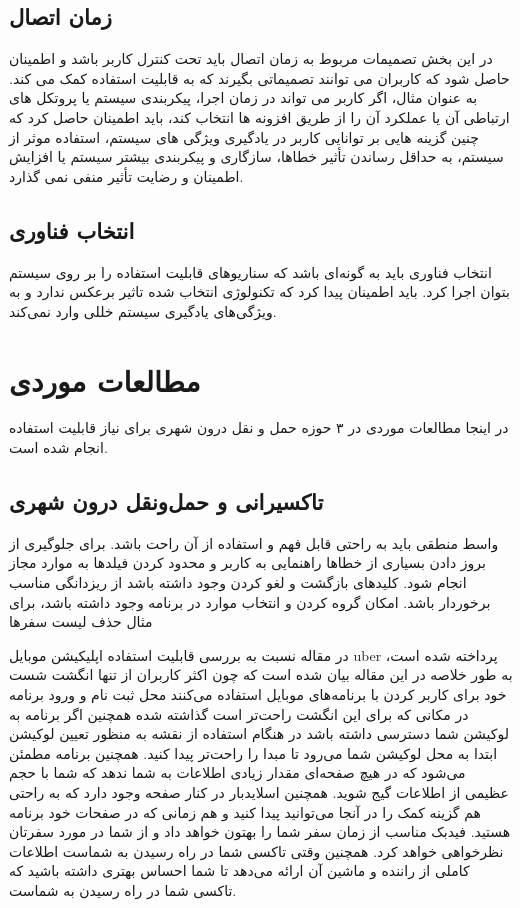 \subsection{زمان اتصال}
در این بخش تصمیمات مربوط به زمان  اتصال باید تحت کنترل کاربر باشد و اطمینان حاصل شود که کاربران می توانند تصمیماتی بگیرند که به قابلیت استفاده کمک می کند.
به عنوان مثال، اگر کاربر می تواند در زمان اجرا، پیکربندی سیستم یا پروتکل های ارتباطی آن یا عملکرد آن را از طریق افزونه ها انتخاب کند، باید اطمینان حاصل کرد که چنین گزینه هایی بر توانایی کاربر در یادگیری ویژگی های سیستم، استفاده موثر از سیستم، به حداقل رساندن تأثیر خطاها، سازگاری و پیکربندی بیشتر سیستم یا افزایش اطمینان و رضایت 
تأثیر منفی نمی گذارد.
\subsection{انتخاب فناوری}
انتخاب فناوری باید به گونه‌ای باشد که سناریو‌های قابلیت استفاده را بر روی سیستم بتوان اجرا کرد.
باید اطمینان پیدا کرد که تکنولوژی انتخاب شده تاثیر برعکس ندارد و به ویژگی‌های یادگیری سیستم خللی وارد نمی‌کند. 


\section{مطالعات موردی}
در اینجا مطالعات موردی در ۳ حوزه حمل و نقل درون شهری برای نیاز قابلیت استفاده انجام شده است. 
\subsection{تاکسیرانی و حمل‌و‌نقل درون شهری}
واسط منطقی باید به راحتی قابل فهم و استفاده از آن راحت باشد. برای جلوگیری از بروز دادن بسیاری از خطاها  راهنمایی به کاربر و محدود کردن فیلدها به موارد مجاز انجام شود.
کلیدهای بازگشت و لغو کردن وجود داشته باشد از ریزدانگی مناسب برخوردار باشد. امکان گروه کردن و انتخاب موارد در برنامه وجود داشته باشد، برای مثال حذف لیست سفرها

در مقاله \cite{uber_ux} نسبت به بررسی قابلیت استفاده اپلیکیشن موبایل uber پرداخته شده است، به طور خلاصه در این مقاله بیان شده است که چون اکثر کاربران از تنها انگشت شست خود برای کاربر کردن با برنامه‌های موبایل استفاده می‌کنند محل ثبت نام و ورود برنامه در مکانی که برای این انگشت راحت‌تر است گذاشته شده همچنین اگر برنامه به لوکیشن شما دسترسی داشته باشد در هنگام استفاده از نقشه به منظور تعیین لوکیشن ابتدا به محل لوکیشن شما می‌رود تا مبدا را راحت‌تر پیدا کنید. 
همچنین برنامه مطمئن می‌شود که در هیچ صفحه‌ای مقدار زیادی اطلاعات به شما ندهد که شما با حجم عظیمی از اطلاعات گیج شوید. 
همچنین اسلایدبار در کنار صفحه وجود دارد که به راحتی هم گزینه کمک را در آنجا می‌توانید پیدا کنید و  هم زمانی که در صفحات خود برنامه هستید. 
فیدبک مناسب از زمان سفر شما را بهتون خواهد داد و از شما در مورد سفرتان نظرخواهی خواهد کرد. 
همچنین وقتی تاکسی شما در راه رسیدن به شماست اطلاعات کاملی از راننده و ماشین آن ارائه می‌دهد تا شما احساس  بهتری داشته باشید که تاکسی شما در راه رسیدن به شماست.

